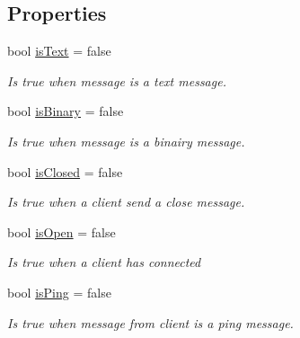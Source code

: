 \subsection*{Properties}
\begin{DoxyCompactItemize}
\item 
bool \mbox{\hyperlink{class_simple_web_socket_server_library_1_1_web_socket_event_arg_ae1619a301983241ee6b8443bcebf6ea0}{is\+Text}} = false
\begin{DoxyCompactList}\small\item\em Is true when message is a text message. \end{DoxyCompactList}\item 
bool \mbox{\hyperlink{class_simple_web_socket_server_library_1_1_web_socket_event_arg_a5378f4e2ca3458f99d8aea904128f421}{is\+Binary}} = false
\begin{DoxyCompactList}\small\item\em Is true when message is a binairy message. \end{DoxyCompactList}\item 
bool \mbox{\hyperlink{class_simple_web_socket_server_library_1_1_web_socket_event_arg_a9c2010cbe732a5b7ae710378fbe94048}{is\+Closed}} = false
\begin{DoxyCompactList}\small\item\em Is true when a client send a close message. \end{DoxyCompactList}\item 
bool \mbox{\hyperlink{class_simple_web_socket_server_library_1_1_web_socket_event_arg_a1b09e765edfe5540bc860ad274b1c045}{is\+Open}} = false
\begin{DoxyCompactList}\small\item\em Is true when a client has connected \end{DoxyCompactList}\item 
bool \mbox{\hyperlink{class_simple_web_socket_server_library_1_1_web_socket_event_arg_ae1f43d554e7a6a3a98775d20fecc57c2}{is\+Ping}} = false
\begin{DoxyCompactList}\small\item\em Is true when message from client is a ping message. \end{DoxyCompactList}\item 

\end{DoxyCompactItemize}

